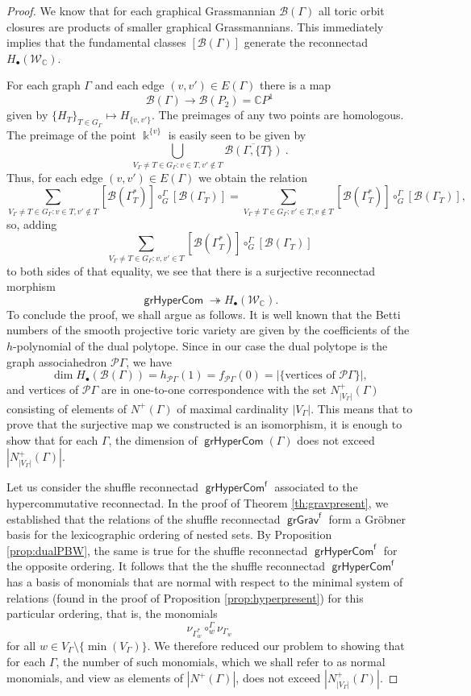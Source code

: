 \documentclass[11pt]{article}
\theoremstyle{definition}
\numberwithin{equation}{section}
\newcommand\calB{\mathcal{B}}
\newcommand\calP{\mathcal{P}}
\newcommand\calW{\mathcal{W}}
\DeclareMathOperator{\grGrav}{\mathsf{grGrav}}
\DeclareMathOperator{\grHyperCom}{\mathsf{grHyperCom}}
\newcommand\kk{\Bbbk}
\begin{document}
\begin{proof}
We know that for each graphical Grassmannian $\calB(\Gamma)$ all toric orbit closures are products of smaller graphical Grassmannians. This immediately implies that the fundamental classes $[\calB(\Gamma)]$ generate the reconnectad $H_{\bullet}(\calW_{\mathbb{C}})$. 

For each graph $\Gamma$ and each edge $(v,v')\in E(\Gamma)$ there is a map 
 \[
\calB(\Gamma)\to \calB(P_2)=\mathbb{C}P^1
 \] 
given by $\{H_T\}_{T\in G_\Gamma}\mapsto H_{\{v,v'\}}$. The preimages of any two points are homologous. The preimage of the point $\kk^{\{v\}}$ is easily seen to be given by 
    \[
\bigcup_{V_\Gamma\ne T\in G_\Gamma\colon v\in T, v'\notin T} \overline{\calB(\Gamma,\{T\})} \ .  
    \]
Thus, for each edge $(v,v')\in E(\Gamma)$ we obtain the relation
 \[
\sum_{V_\Gamma\ne T\in G_\Gamma\colon v \in T, v'\notin T} [\calB(\Gamma^*_T)]\circ_G^{\Gamma} [\calB(\Gamma_T)]= 
\sum_{V_\Gamma\ne T\in G_\Gamma\colon v'\in T, v \notin T} [\calB(\Gamma^*_T)]\circ_G^{\Gamma} [\calB(\Gamma_T)],
 \]
so, adding 
 \[
\sum_{V_\Gamma\ne T\in G_\Gamma\colon v,v' \in T} [\calB(\Gamma^*_T)]\circ_G^{\Gamma} [\calB(\Gamma_T)]
 \]
to both sides of that equality, we see that there is a surjective reconnectad morphism
 \[
\grHyperCom\twoheadrightarrow H_{\bullet}(\calW_{\mathbb{C}}).
 \]
To conclude the proof, we shall argue as follows. It is well known that the Betti numbers of the smooth projective toric variety are given by the coefficients of the $h$-polynomial of the dual polytope. Since in our case the dual polytope is the graph associahedron $\calP\Gamma$, we have
 \[
\dim H_{\bullet}(\calB(\Gamma))=h_{\calP\Gamma}(1)=f_{\calP\Gamma}(0)=|\{\text{vertices of } \calP\Gamma\}|,
 \] 
and vertices of $\calP\Gamma$ are in one-to-one correspondence with the set $N^+_{|V_\Gamma|}(\Gamma)$ consisting of elements of $N^+(\Gamma)$ of maximal cardinality $|V_\Gamma|$. This means that to prove that the surjective map we constructed is an isomorphism, it is enough to show that for each $\Gamma$, the dimension of $\grHyperCom(\Gamma)$ does not exceed $|N^+_{|V_\Gamma|}(\Gamma)|$.

Let us consider the shuffle reconnectad $\grHyperCom^{\mathsf{f}}$ associated to the hypercommutative reconnectad. In the proof of Theorem \ref{th:gravpresent}, we established that the relations of the shuffle reconnectad $\grGrav^{\mathsf{f}}$ form a Gr\"obner basis for the lexicographic ordering of nested sets. By Proposition \ref{prop:dualPBW}, the same is true for the shuffle reconnectad $\grHyperCom^{\mathsf{f}}$ for the opposite ordering. It follows that the the shuffle reconnectad $\grHyperCom^{\mathsf{f}}$ has a basis of monomials that are
normal with respect to the minimal system of relations (found in the proof of Proposition \ref{prop:hyperpresent}) for this particular ordering, that is, the monomials 
 \[
\nu_{\Gamma_w^*}\circ_w^{\Gamma}\nu_{\Gamma_w}
 \]
for all $w\in V_\Gamma\setminus\{\min(V_\Gamma)\}$. We therefore reduced our problem to showing that for each $\Gamma$, the number of such monomials, which we shall refer to as normal monomials, and view as elements of $|N^+(\Gamma)|$, does not exceed $|N^+_{|V_\Gamma|}(\Gamma)|$.


\end{proof}
\end{document}
